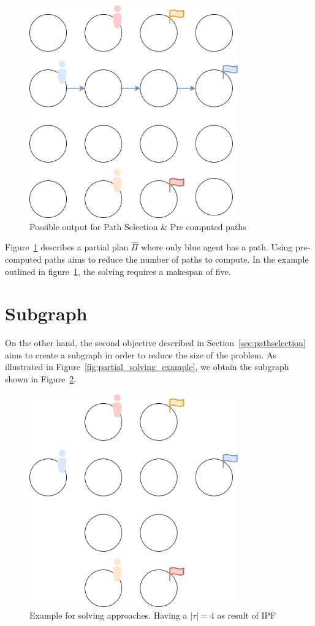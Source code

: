 \begin{figure}[H]
    \centering
    \caption{Possible output for Path Selection \& Pre computed paths}\label{fig:pre_computed_path_solving}
    \includegraphics[width=9cm]{img/pre_computed_path_solving.drawio.png}
\end{figure}

Figure~\ref{fig:pre_computed_path_solving} describes a partial plan \(\hat{\Pi}\) where only blue agent has a path. Using pre-computed paths aims to reduce the number of paths to compute. In the example outlined in figure~\ref{fig:pre_computed_path_solving}, the solving requires a makespan of five.

\section{Subgraph}

On the other hand, the second objective described in Section~\ref{sec:pathselection} aims to create a subgraph in order to reduce the size of the problem. As illustrated in Figure~\ref{fig:partial_solving_example}, we obtain the subgraph shown in Figure~\ref{fig:subgraph_solving}.

\begin{figure}[H]
    \centering
    \caption{Example for solving approaches. Having a \(|\tau| = 4\) as result of IPF}\label{fig:subgraph_solving}
    \includegraphics[width=9cm]{img/subgraph_solving.png}
\end{figure}

